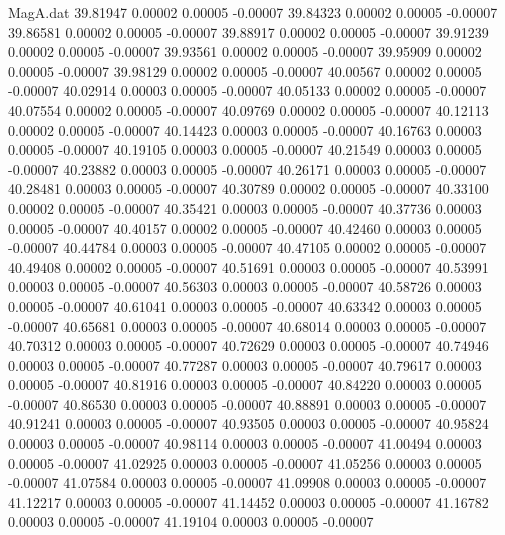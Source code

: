 \begin{filecontents}{MagA.dat}
  39.81947    0.00002    0.00005   -0.00007
  39.84323    0.00002    0.00005   -0.00007
  39.86581    0.00002    0.00005   -0.00007
  39.88917    0.00002    0.00005   -0.00007
  39.91239    0.00002    0.00005   -0.00007
  39.93561    0.00002    0.00005   -0.00007
  39.95909    0.00002    0.00005   -0.00007
  39.98129    0.00002    0.00005   -0.00007
  40.00567    0.00002    0.00005   -0.00007
  40.02914    0.00003    0.00005   -0.00007
  40.05133    0.00002    0.00005   -0.00007
  40.07554    0.00002    0.00005   -0.00007
  40.09769    0.00002    0.00005   -0.00007
  40.12113    0.00002    0.00005   -0.00007
  40.14423    0.00003    0.00005   -0.00007
  40.16763    0.00003    0.00005   -0.00007
  40.19105    0.00003    0.00005   -0.00007
  40.21549    0.00003    0.00005   -0.00007
  40.23882    0.00003    0.00005   -0.00007
  40.26171    0.00003    0.00005   -0.00007
  40.28481    0.00003    0.00005   -0.00007
  40.30789    0.00002    0.00005   -0.00007
  40.33100    0.00002    0.00005   -0.00007
  40.35421    0.00003    0.00005   -0.00007
  40.37736    0.00003    0.00005   -0.00007
  40.40157    0.00002    0.00005   -0.00007
  40.42460    0.00003    0.00005   -0.00007
  40.44784    0.00003    0.00005   -0.00007
  40.47105    0.00002    0.00005   -0.00007
  40.49408    0.00002    0.00005   -0.00007
  40.51691    0.00003    0.00005   -0.00007
  40.53991    0.00003    0.00005   -0.00007
  40.56303    0.00003    0.00005   -0.00007
  40.58726    0.00003    0.00005   -0.00007
  40.61041    0.00003    0.00005   -0.00007
  40.63342    0.00003    0.00005   -0.00007
  40.65681    0.00003    0.00005   -0.00007
  40.68014    0.00003    0.00005   -0.00007
  40.70312    0.00003    0.00005   -0.00007
  40.72629    0.00003    0.00005   -0.00007
  40.74946    0.00003    0.00005   -0.00007
  40.77287    0.00003    0.00005   -0.00007
  40.79617    0.00003    0.00005   -0.00007
  40.81916    0.00003    0.00005   -0.00007
  40.84220    0.00003    0.00005   -0.00007
  40.86530    0.00003    0.00005   -0.00007
  40.88891    0.00003    0.00005   -0.00007
  40.91241    0.00003    0.00005   -0.00007
  40.93505    0.00003    0.00005   -0.00007
  40.95824    0.00003    0.00005   -0.00007
  40.98114    0.00003    0.00005   -0.00007
  41.00494    0.00003    0.00005   -0.00007
  41.02925    0.00003    0.00005   -0.00007
  41.05256    0.00003    0.00005   -0.00007
  41.07584    0.00003    0.00005   -0.00007
  41.09908    0.00003    0.00005   -0.00007
  41.12217    0.00003    0.00005   -0.00007
  41.14452    0.00003    0.00005   -0.00007
  41.16782    0.00003    0.00005   -0.00007
  41.19104    0.00003    0.00005   -0.00007

\end{filecontents}
